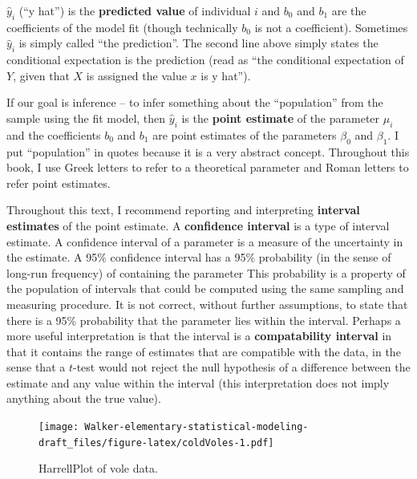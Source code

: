 \documentclass[]{book}
\begin{document}
\(\hat{y}_i\) (``y hat'') is the \textbf{predicted value} of individual
\(i\) and \(b_0\) and \(b_1\) are the coefficients of the model fit
(though technically \(b_0\) is not a coefficient). Sometimes
\(\hat{y}_i\) is simply called ``the prediction''. The second line above
simply states the conditional expectation is the prediction (read as
``the conditional expectation of \(Y\), given that \(X\) is assigned the
value \(x\) is y hat'').

If our goal is inference -- to infer something about the ``population''
from the sample using the fit model, then \(\hat{y}_i\) is the
\textbf{point estimate} of the parameter \(\mu_i\) and the coefficients
\(b_0\) and \(b_1\) are point estimates of the parameters \(\beta_0\)
and \(\beta_1\). I put ``population'' in quotes because it is a very
abstract concept. Throughout this book, I use Greek letters to refer to
a theoretical parameter and Roman letters to refer point estimates.

Throughout this text, I recommend reporting and interpreting
\textbf{interval estimates} of the point estimate. A \textbf{confidence
interval} is a type of interval estimate. A confidence interval of a
parameter is a measure of the uncertainty in the estimate. A 95\%
confidence interval has a 95\% probability (in the sense of long-run
frequency) of containing the parameter This probability is a property of
the population of intervals that could be computed using the same
sampling and measuring procedure. It is not correct, without further
assumptions, to state that there is a 95\% probability that the
parameter lies within the interval. Perhaps a more useful interpretation
is that the interval is a \textbf{compatability interval} in that it
contains the range of estimates that are compatible with the data, in
the sense that a \(t\)-test would not reject the null hypothesis of a
difference between the estimate and any value within the interval (this
interpretation does not imply anything about the true value).

\begin{figure}
\centering
\texttt{[image: Walker-elementary-statistical-modeling-draft\_files/figure-latex/coldVoles-1.pdf]}
\caption{\label{fig:coldVoles}HarrellPlot of vole data.}
\end{figure}
\end{document}
